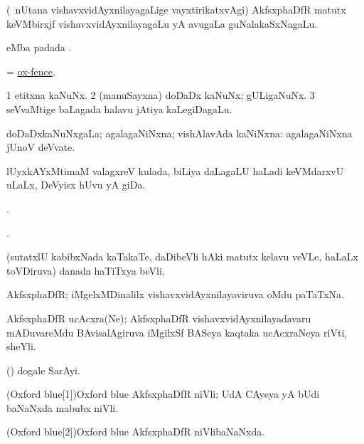\bentry
{}
\gl{\nA}
\bmng
(\kanmu\ nUtana vishavxvidAyxnilayagaLige vayxtirikatxvAgi) AkfsxphaDfR matutx keVMbirxjf vishavxvidAyxnilayagaLu yA avugaLa guNalakaSxNagaLu. 
\emng
\eentry

\bentry
{}
\gl{\nA}
\bmng
{} eMba padada \bava. 
\emng
\eentry

\bentry
{}
\gl{\nA}
\bmng
= \hyperlink{ox-fence}{ox-fence}. 
\emng
\eentry

\bentry
{}
\gl{\nA}
\bmng
\bnum
\num{1} etitxna kaNuNx. 
\num{2} (manuSayxna) doDaDx kaNuNx; gULigaNuNx. 
\num{3} seVvaMtige baLagada halavu jAtiya kaLegiDagaLu. 
\enum
\emng
\eentry

\bentry
{}
\gl{\gu}
\bmng
doDaDxkaNuNxgaLa; agalagaNiNxna; vishAlavAda kaNiNxna:  agalagaNiNxna jUnoV deVvate. 
\emng
\eentry

\bentry
{}
\gl{\nA}
\bmng
lUyxkAYxMtimaM valagxreV kulada, biLiya daLagaLU haLadi keVMdarxvU uLaLx, DeVyisx hUvu yA giDa. 
\emng
\eentry

\bentry
{}
\gl{\saMkiSx}
\bmng
{}. 
\emng
\eentry

\bentry
{}
\gl{\saMkiSx}
\bmng
{}. 
\emng
\eentry

\bentry
{}
\gl{\nA}
\bmng
(sutatxlU kabibxNada kaTakaTe, daDibeVli hAki matutx kelavu veVLe, haLaLx toVDiruva) danada haTiTxya beVli. 
\emng
\eentry

\bentry
{}
\gl{\nA}
\bmng
AkfsxphaDfR; iMgelxMDinalilx vishavxvidAyxnilayaviruva oMdu paTaTxNa. 
\emng
\eentry

\bentry
{}
\gl{\nA}
\bmng
AkfsxphaDfR ucAcxra(Ne); AkfsxphaDfR vishavxvidAyxnilayadavaru mADuvareMdu BAvisalAgiruva iMgilxSf BASeya kaqtaka ucAcxraNeya riVti, sheYli. 
\emng
\eentry

\bentry
{}
\gl{\nA}
\bmng
(\birx) dogale SarAyi. 
\emng
\eentry

\bentry
\word(Oxford blue[1]){Oxford blue}
\gl{\nA}
\bmng
AkfsxphaDfR niVli; UdA CAyeya yA bUdi baNaNxda mabubx niVli. 
\emng
\eentry

\bentry
\word(Oxford blue[2]){Oxford blue}
\gl{\gu}
\bmng
AkfsxphaDfR niVlibaNaNxda. 
\emng
\eentry

